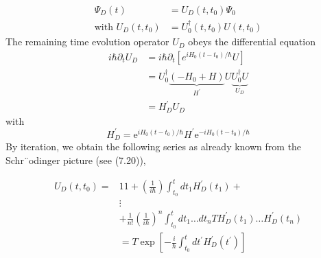 \begin{equation}
\begin{aligned} \Psi_{D}(t) &=U_{D}\left(t, t_{0}\right) \Psi_{0} \\ \text{with } U_{D}\left(t, t_{0}\right) &=U_{0}^{\dagger}\left(t, t_{0}\right) U\left(t, t_{0}\right) \end{aligned}
\end{equation}
The remaining time evolution operator $U_D$ obeys the differential equation
\begin{equation}
\begin{aligned} i \hbar \partial_{t} U_{D} &=i \hbar \partial_{t}\left[e^{i H_{0}\left(t-t_{0}\right) / \hbar} U\right] \\ &=U_{0}^{\dagger} \underbrace{\left(-H_{0}+H\right)}_{H^{\prime}} U \underbrace{U_{0}^{\dagger} U}_{U_{D}} \\ &=H_{D}^{\prime} U_{D} \end{aligned}
\end{equation}
with
\begin{equation}
    H_{D}^{\prime}=\mathrm{e}^{i H_{0}\left(t-t_{0}\right) / \hbar} H^{\prime} \mathrm{e}^{-i H_{0}\left(t-t_{0}\right) / \hbar}
    \end{equation}
By iteration, we obtain the following series as already known from the Schr¨odinger picture (see (7.20)),

\begin{align} 
    U_{D}\left(t, t_{0}\right)=& 11+\left(\frac{1}{i \hbar}\right) \int_{t_{0}}^{t} d t_{1} H_{D}^{\prime}\left(t_{1}\right)+\nonumber\\ 
    & \vdots \nonumber\\ 
    &+\frac{1}{n !}\left(\frac{1}{i \hbar}\right)^{n} \int_{t_{0}}^{t} d t_{1} \ldots d t_{n} T H_{D}^{\prime}\left(t_{1}\right) \ldots H_{D}^{\prime}\left(t_{n}\right)\\ 
    &=T \exp \left[-\frac{i}{\hbar} \int_{t_{0}}^{t} d t^{\prime} H_{D}^{\prime}\left(t^{\prime}\right)\right]
\end{align}
